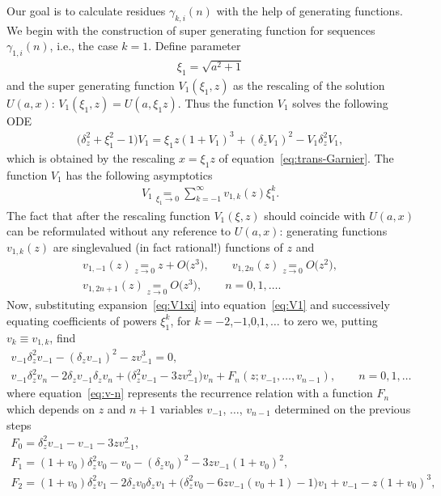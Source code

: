 \documentclass[pdftex]{sigma}
\numberwithin{equation}{section}
\begin{document}
Our goal is to calculate residues $\gamma_{k,i}(n)$ with the help of generating functions. We begin with the construction
of super generating function for sequences $\gamma_{1,i}(n)$, i.e., the case $k=1$. Define parameter
\begin{gather}\label{eq:xi1}
\xi_1=\sqrt{a^2+1}
\end{gather}
and the super generating function $V_1(\xi_1,z)$ as the rescaling of the solution $U(a,x)$: $V_1(\xi_1,z)=U(a,\xi_1 z)$.
Thus the function $V_1$ solves the following ODE
\begin{gather}\label{eq:V1}
\big(\delta_z^2+\xi_1^2-1\big)V_1=\xi_1 z(1+V_1)^3+(\delta_zV_1)^2-V_1\delta_z^2V_1,
\end{gather}
which is obtained by the rescaling $x=\xi_1 z$ of equation~\eqref{eq:trans-Garnier}. The function $V_1$ has the following
asymptotics
\begin{gather}\label{eq:V1xi}
V_1\underset{\xi_1\to 0}=\sum\limits_{k=-1}^\infty v_{1,k}(z)\xi_1^k.
\end{gather}
The fact that after the rescaling function $V_1(\xi,z)$ should coincide with $U(a,x)$ can be reformulated without any reference
to $U(a,x)$: generating functions $v_{1,k}(z)$ are singlevalued (in fact rational!) functions of $z$ and
\begin{gather}
v_{1,-1}(z)\underset{z\to0}=z+O\big(z^3\big),\qquad
v_{1,2n}(z)\underset{z\to0}=O\big(z^2\big),\nonumber\\
v_{1,2n+1}(z)\underset{z\to0}=O\big(z^3\big),\qquad n=0,1,\ldots.\label{eq:v1-initialdata}
\end{gather}
Now, substituting expansion~\eqref{eq:V1xi} into equation~\eqref{eq:V1} and successively equating coefficients of powers
$\xi_1^k$, for $k=-2$,$-1$,$0$,$1,\ldots$ to zero we, putting $v_k\equiv v_{1,k}$, find
\begin{gather}
v_{-1}\delta_{z}^2v_{-1}-(\delta_{z}v_{-1})^2-zv_{-1}^3=0,\label{eq:v-1}\\
v_{-1}\delta_{z}^2v_n-2\delta_{z}v_{-1}\delta_{z}v_n+\big(\delta_{z}^2v_{-1}-3zv_{-1}^2\big)v_n+F_n(z;v_{-1},\ldots,v_{n-1}), \qquad n=0,1,\ldots\label{eq:v-n}
\end{gather}
where equation~\eqref{eq:v-n} represents the recurrence relation with a function $F_n$ which depends on $z$ and $n+1$
variables $v_{-1}$, $\ldots$, $v_{n-1}$ determined on the previous steps
\begin{gather*}
F_0 =\delta_z^2v_{-1}-v_{-1}-3zv_{-1}^2,\\ %
F_1 =(1+v_0)\delta_z^2v_0-v_0-(\delta_zv_0)^2-3zv_{-1}(1+v_0)^2,\\ %
F_2 =(1+v_0)\delta_z^2v_1-2\delta_zv_0\delta_zv_1+\big(\delta_z^2v_0-6zv_{-1}(v_0+1)-1\big)v_1+v_{-1}-z(1+v_0)^3,%
\end{gather*}
\end{document}
